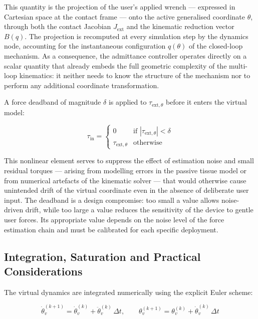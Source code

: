 This quantity is the projection of the user's applied wrench — expressed in Cartesian space at the contact frame — onto the active generalised coordinate $\theta$, through both the contact Jacobian $J_{\mathrm{ext}}$ and the kinematic reduction vector $B(q)$. The projection is recomputed at every simulation step by the dynamics node, accounting for the instantaneous configuration $q(\theta)$ of the closed-loop mechanism. As a consequence, the admittance controller operates directly on a scalar quantity that already embeds the full geometric complexity of the multi-loop kinematics: it neither needs to know the structure of the mechanism nor to perform any additional coordinate transformation.
 
A force deadband of magnitude $\delta$ is applied to $\tau_{\mathrm{ext},\theta}$ before it enters the virtual model:

\begin{equation}
    \tau_{\mathrm{in}} =
\begin{cases}
0             & \text{if } |\tau_{\mathrm{ext},\theta}| < \delta \\
\tau_{\mathrm{ext},\theta} & \text{otherwise}
\end{cases}
\end{equation}


This nonlinear element serves to suppress the effect of estimation noise and small residual torques — arising from modelling errors in the passive tissue model or from numerical artefacts of the kinematic solver — that would otherwise cause unintended drift of the virtual coordinate even in the absence of deliberate user input. The deadband is a design compromise: too small a value allows noise-driven drift, while too large a value reduces the sensitivity of the device to gentle user forces. Its appropriate value depends on the noise level of the force estimation chain and must be calibrated for each specific deployment.

\subsection{Integration, Saturation and Practical Considerations}
The virtual dynamics are integrated numerically using the explicit Euler scheme:

\begin{equation}
    \dot\theta_v^{(k+1)} = \dot\theta_v^{(k)} + \ddot\theta_v^{(k)}\,\Delta t, \qquad
\theta_v^{(k+1)}   = \theta_v^{(k)}   + \dot\theta_v^{(k)}\,\Delta t
\end{equation}

